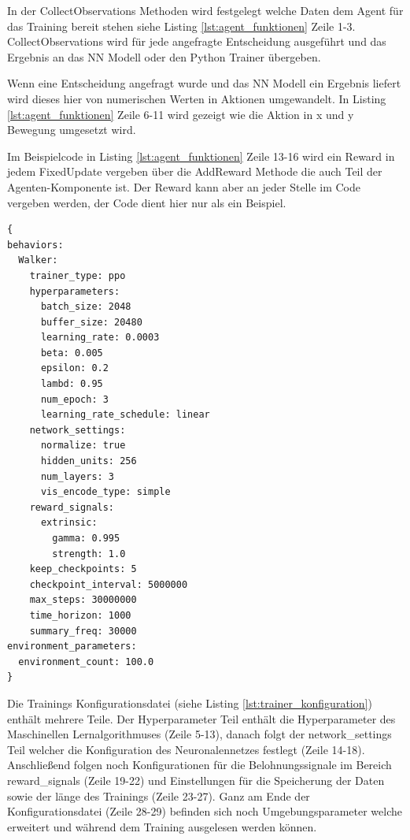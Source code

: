 In der CollectObservations Methoden wird festgelegt welche Daten dem Agent für das Training bereit stehen siehe Listing \ref{lst:agent_funktionen} Zeile 1-3. CollectObservations wird für jede angefragte Entscheidung ausgeführt und das Ergebnis an das NN Modell oder den Python Trainer übergeben.

Wenn eine Entscheidung angefragt wurde und das NN Modell ein Ergebnis liefert wird dieses hier von numerischen Werten in Aktionen umgewandelt. In Listing \ref{lst:agent_funktionen} Zeile 6-11 wird gezeigt wie die Aktion in x und y Bewegung umgesetzt wird.

Im Beispielcode in Listing \ref{lst:agent_funktionen} Zeile 13-16 wird ein Reward in jedem FixedUpdate vergeben über die AddReward Methode die auch Teil der Agenten-Komponente ist. Der Reward kann aber an jeder Stelle im Code vergeben werden, der Code dient hier nur als ein Beispiel.

\begin{lstlisting}[caption={Trainer Konfigurationsdatei},captionpos=b,label={lst:trainer_konfiguration}]
{
behaviors:
  Walker:
    trainer_type: ppo
    hyperparameters:
      batch_size: 2048
      buffer_size: 20480
      learning_rate: 0.0003
      beta: 0.005
      epsilon: 0.2
      lambd: 0.95
      num_epoch: 3
      learning_rate_schedule: linear
    network_settings:
      normalize: true
      hidden_units: 256
      num_layers: 3
      vis_encode_type: simple
    reward_signals:
      extrinsic:
        gamma: 0.995
        strength: 1.0
    keep_checkpoints: 5
    checkpoint_interval: 5000000
    max_steps: 30000000
    time_horizon: 1000
    summary_freq: 30000
environment_parameters:
  environment_count: 100.0
}
\end{lstlisting}

Die Trainings Konfigurationsdatei (siehe Listing \ref{lst:trainer_konfiguration}) enthält mehrere Teile. Der Hyperparameter Teil enthält die Hyperparameter des Maschinellen Lernalgorithmuses (Zeile 5-13), danach folgt der network\_settings Teil welcher die Konfiguration des Neuronalennetzes festlegt (Zeile 14-18). Anschließend folgen noch Konfigurationen für die Belohnungssignale im Bereich reward\_signals (Zeile 19-22) und Einstellungen für die Speicherung der Daten sowie der länge des Trainings (Zeile 23-27). Ganz am Ende der Konfigurationsdatei (Zeile 28-29) befinden sich noch Umgebungsparameter welche erweitert und während dem Training ausgelesen werden können.

